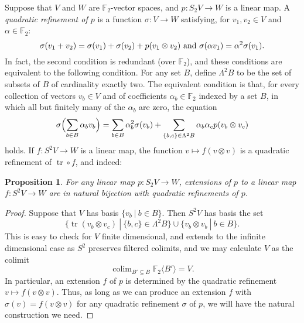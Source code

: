 \documentclass[11pt]{amsart} \renewcommand{\baselinestretch}{1.4}
\theoremstyle{plain}
\newtheorem{prop}[thm]{Proposition}
\theoremstyle{definition}
\DeclareMathOperator{\trace}{tr}
\DeclareMathOperator*{\colim}{colim}
\renewcommand{\to}{\longrightarrow}
\newcommand{\F}{\mathbb{F}}
\newcommand{\Ftwo}{\F_2}
\renewcommand{\mapsto}{\longmapsto}
\begin{document}
\begin{Conventions and notation}
Suppose that $V$ and $W$ are $\Ftwo $-vector spaces, and $p:S_2V\to W$ is a linear map. A \emph{quadratic refinement of $p$} is a function $\sigma:V\to W$ satisfying, for $v_1,v_2\in V$ and $\alpha\in\Ftwo $:
\[\sigma(v_1+v_2)=\sigma(v_1)+\sigma(v_2)+p(v_1\otimes v_2)\textup{ and }\sigma(\alpha v_1)=\alpha^2\sigma(v_1).\]
In fact, the second condition is redundant (over $\Ftwo $), and these conditions are equivalent to the following condition. For any set $B$, define $\Lambda^2B$ to be the set of subsets of $B$ of cardinality exactly two. 
The equivalent condition is that, for every collection of vectors $v_b\in V$ and of coefficients $\alpha_b\in \Ftwo $ indexed by a set $B$, in which all but finitely many of the $\alpha_b$ are zero, the equation
\[\sigma\Bigl(\sum_{b\in B}\alpha_bv_b\Bigr)=\sum_{b\in B}\alpha_b^2\sigma(v_b)+\sum_{\{b,c\}\in \Lambda^2B}\alpha_b\alpha_cp(v_b\otimes v_c)\]
holds.
%
%
%
%
%
If $f:S^2V\to W$ is a linear map, the function
$v\mapsto f(v\otimes v)$
is a quadratic refinement of $\trace\circ f$, and indeed:
\begin{prop}
\label{propOnExtendingToInvariants}
For any linear map $p:S_2V\to W$, extensions of $p$ to a linear map $f:S^2V\to W$ are in natural bijection  with quadratic refinements of $p$.
\end{prop}
\begin{proof}
Suppose that $V$ has basis $\{v_b\ |\ b\in B\}$. Then $S^2V$ has basis the set 
\[\{\trace(v_b\otimes v_c)\ |\ \{b,c\}\in\Lambda^2B\}\cup\{v_b\otimes v_b\ |\ b\in B\}.\]
This is easy to check for $V$ finite dimensional, and extends to the infinite dimensional case as $S^2$ preserves filtered colimits, and we may calculate $V$ as the colimit
\[\colim_{B'\subseteq B}\Ftwo \langle B'\rangle=V.\]
In particular, an extension $f$ of $p$ is determined by the quadratic refinement $v\mapsto f(v\otimes v)$. Thus, as long as we can produce an extension $f$ with $\sigma(v)=f(v\otimes v)$ for any quadratic refinement $\sigma$ of $p$, we will have the natural construction we need.


\end{proof}
\end{Conventions and notation}
\end{document}
